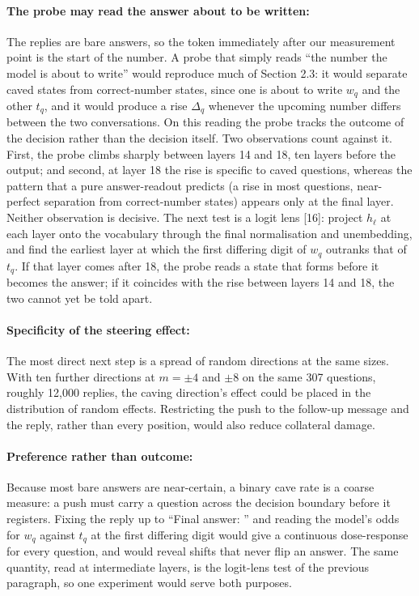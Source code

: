 \documentclass[12pt]{report}
\theoremstyle{definition}
\begin{document}
\paragraph{The probe may read the answer about to be written:}
The replies are bare answers, so the token immediately after our measurement point is the start of the number. A probe that simply reads ``the number the model is about to write'' would reproduce much of Section 2.3: it would separate caved states from correct-number states, since one is about to write $w_q$ and the other $t_q$, and it would produce a rise $\Delta_q$ whenever the upcoming number differs between the two conversations. On this reading the probe tracks the outcome of the decision rather than the decision itself. Two observations count against it. First, the probe climbs sharply between layers 14 and 18, ten layers before the output; and second, at layer 18 the rise is specific to caved questions, whereas the pattern that a pure answer-readout predicts (a rise in most questions, near-perfect separation from correct-number states) appears only at the final layer. Neither observation is decisive. The next test is a logit lens [16]: project $h_\ell$ at each layer onto the vocabulary through the final normalisation and unembedding, and find the earliest layer at which the first differing digit of $w_q$ outranks that of $t_q$. If that layer comes after 18, the probe reads a state that forms before it becomes the answer; if it coincides with the rise between layers 14 and 18, the two cannot yet be told apart.

\paragraph{Specificity of the steering effect:}
The most direct next step is a spread of random directions at the same sizes. With ten further directions at $m = \pm4$ and $\pm8$ on the same 307 questions, roughly 12,000 replies, the caving direction's effect could be placed in the distribution of random effects. Restricting the push to the follow-up message and the reply, rather than every position, would also reduce collateral damage.

\paragraph{Preference rather than outcome:}
Because most bare answers are near-certain, a binary cave rate is a coarse measure: a push must carry a question across the decision boundary before it registers. Fixing the reply up to ``Final answer: '' and reading the model's odds for $w_q$ against $t_q$ at the first differing digit would give a continuous dose-response for every question, and would reveal shifts that never flip an answer. The same quantity, read at intermediate layers, is the logit-lens test of the previous paragraph, so one experiment would serve both purposes.
\end{document}
